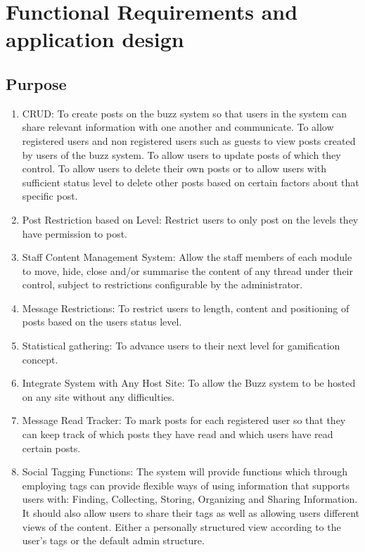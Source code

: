 \documentclass[hidelinks, 12pt, oneside]{article}
\begin{document}
\section{Functional Requirements and application design}

\subsection{Purpose}
\begin{enumerate}
 \item{CRUD}: To create posts on the buzz system so that users in the system can share relevant information with one another and communicate. To allow registered users and non registered users such as guests to view posts created by users of the buzz system. To allow users to update posts of which they control. To allow users to delete their own posts or to allow users with sufficient status level to delete other posts based on certain factors about that specific post.
 
 \item{Post Restriction based on Level}: Restrict users to only post on the levels they have permission to post.

 \item{Staff Content Management System}: Allow the staff members of each module to move, hide, close and/or summarise the content of any thread under their control, subject to restrictions configurable by the administrator.
 
 \item{Message Restrictions}: To restrict users to length, content and positioning of posts based on the users status level.

 \item{Statistical gathering}: To advance users to their next level for gamification concept.
 
 \item{Integrate System with Any Host Site}: To allow the Buzz system to be hosted on any site without any difficulties.

 \item{Message Read Tracker}: To mark posts for each registered user so that they can keep track of which posts they have read and which users have read certain posts.

 \item{Social Tagging Functions}: The system will provide functions which through employing tags can provide flexible ways of using information that supports users with: Finding, Collecting, Storing, Organizing and Sharing Information. It should also allow users to share their tags as well as allowing users different views of the content. Either a personally structured view according to the user's tags or the default admin structure.


\end{enumerate}
\end{document}
